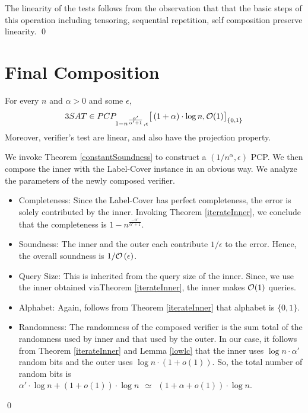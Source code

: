 \noindent The linearity of the tests follows from the observation that
that the basic steps of this operation including tensoring, sequential
repetition, self composition preserve linearity.  \qed


\section{Final Composition}

\begin{theorem}\label{constantSoundness}
  For every $n$ and $\alpha > 0$ and some $\epsilon$,
\[
3SAT \in PCP_{1 - {n^{\frac{\alpha'}{\alpha' + 1}}}, {\epsilon}} \big[ \left( 1 + \alpha \right) \cdot \log n, {\cal O}(1) \big ]_{\{0,1\}}
\]
Moreover, verifier's test are linear, and also have the projection
property.
\end{theorem}
  We invoke Theorem
\ref{constantSoundness} to construct a $(1/ n^\alpha,
  \epsilon)$ PCP. We then compose the inner with the
Label-Cover instance in an obvious way. We analyze the parameters of
the newly composed verifier.

\begin{itemize}
\item Completeness: Since the Label-Cover has perfect completeness,
  the error is solely contributed by the inner. Invoking Theorem
  \ref{iterateInner}, we conclude that the completeness is $1 - n^{\frac{-\alpha'}{\alpha' + 1}}$.

\item Soundness: The inner and the outer each contribute $1/\epsilon$
  to the error. Hence, the overall soundness is $1/{\cal
    O}\left(\epsilon\right)$.

\item Query Size: This is inherited from the query size of the
  inner. Since, we use the inner obtained viaTheorem \ref{iterateInner}, the
  inner makes ${\cal O}(1)$ queries.

\item Alphabet: Again, follows from Theorem \ref{iterateInner} that alphabet
  is $\{0,1\}$.

  \item Randomness: The randomness of the composed verifier is the sum
    total of the randomness used by inner and that used by the
    outer. In our case, it follows from Theorem \ref{iterateInner} and Lemma
    \ref{lowlc} that the inner uses $\log n \cdot \alpha'$ random bits and the outer uses $\log n \cdot \left(1
      +o(1)\right)$. So, the total number of random bits is $\alpha' \cdot \log n + \left(1 +
      o\left(1\right)\right) \cdot \log n \ \ \simeq \ \ \left(1 +
      \alpha + o(1)\right) \cdot \log n$.
\end{itemize}
\qed



